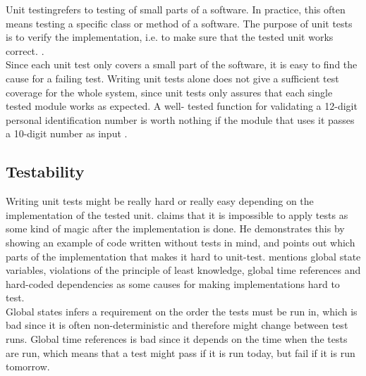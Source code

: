 \MakeShortVerb{\|}


Unit testing\footnotemark refers to testing of small parts of a
software. In practice, this often means testing a specific class or
method of a software. The purpose of unit tests is to verify the
implementation, i.e. to make sure that the tested unit works correct.
\cite{web:xp_unittests}\cite{book:pfleeger}.\\

Since each unit test only covers a small part of the software, it is
easy to find the cause for a failing test. Writing unit tests alone does
not give a sufficient test coverage for the whole system, since unit
tests only assures that each single tested module works as expected. A
well- tested function for validating a 12-digit personal identification
number is worth nothing if the module that uses it passes a 10-digit
number as input \cite{wiki:unittests}.\\


\subsection{Testability}

Writing unit tests might be really hard or really easy depending on the
implementation of the tested unit. \citet{video:misko_psychology} claims
that it is impossible to apply tests as some kind of magic after the
implementation is done. He demonstrates this by showing an example of
code written without tests in mind, and points out which parts of the
implementation that makes it hard to unit-test.
\citeauthor{video:misko_psychology} mentions global state variables,
violations of the principle of least knowledge, global time references
and hard-coded dependencies as some causes for making implementations
hard to test.\\

Global states infers a requirement on the order the tests
must be run in, which is bad since it is often non-deterministic and
therefore might change between test runs. Global time references is bad
since it depends on the time when the tests are run, which means that a
test might pass if it is run today, but fail if it is run tomorrow.\\

